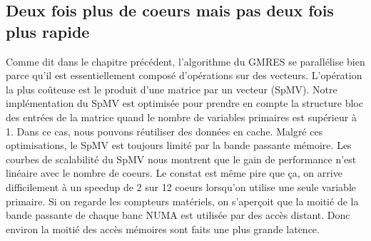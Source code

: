 \subsection{Deux fois plus de coeurs mais pas deux fois plus rapide}
Comme dit dans le chapitre précédent, l'algorithme du GMRES se parallélise bien parce qu'il est essentiellement composé d'opérations sur des vecteurs.
%
L'opération la plus coûteuse est le produit d'une matrice par un vecteur (SpMV).
%
Notre implémentation du SpMV est optimisée pour prendre en compte la structure bloc des entrées de la matrice quand le nombre de variables primaires est supérieur à 1.
%
Dans ce cas, nous pouvons réutiliser des données en cache.
%
Malgré ces optimisations, le SpMV est toujours limité par la bande passante mémoire.
%
Les courbes de scalabilité du SpMV nous montrent que le gain de performance n'est linéaire avec le nombre de coeurs.
%
Le constat est même pire que ça, on arrive difficilement à un speedup de 2 sur 12 coeurs lorsqu'on utilise une seule variable primaire.
%
Si on regarde les compteurs matériels, on s'aperçoit que la moitié de la bande passante de chaque banc NUMA est utilisée par des accès distant.
%
Donc environ la moitié des accès mémoires sont faits une plus grande latence.
